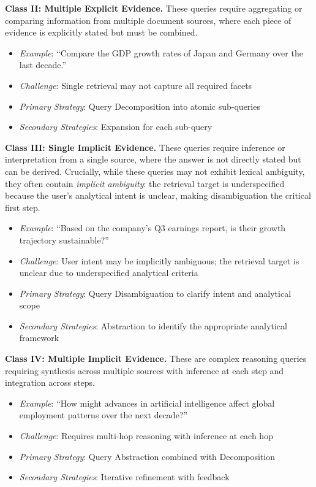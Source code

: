 \documentclass{article}
\begin{document}
\textbf{Class II: Multiple Explicit Evidence.} These queries require aggregating or comparing information from multiple document sources, where each piece of evidence is explicitly stated but must be combined.
\begin{itemize}[leftmargin=*,nosep]
    \item \textit{Example}: ``Compare the GDP growth rates of Japan and Germany over the last decade.''
    \item \textit{Challenge}: Single retrieval may not capture all required facets
    \item \textit{Primary Strategy}: Query Decomposition into atomic sub-queries
    \item \textit{Secondary Strategies}: Expansion for each sub-query
\end{itemize}

\textbf{Class III: Single Implicit Evidence.} These queries require inference or interpretation from a single source, where the answer is not directly stated but can be derived. Crucially, while these queries may not exhibit lexical ambiguity, they often contain \textit{implicit ambiguity}: the retrieval target is underspecified because the user's analytical intent is unclear, making disambiguation the critical first step.
\begin{itemize}[leftmargin=*,nosep]
    \item \textit{Example}: ``Based on the company's Q3 earnings report, is their growth trajectory sustainable?''
    \item \textit{Challenge}: User intent may be implicitly ambiguous; the retrieval target is unclear due to underspecified analytical criteria
    \item \textit{Primary Strategy}: Query Disambiguation to clarify intent and analytical scope
    \item \textit{Secondary Strategies}: Abstraction to identify the appropriate analytical framework
\end{itemize}

\textbf{Class IV: Multiple Implicit Evidence.} These are complex reasoning queries requiring synthesis across multiple sources with inference at each step and integration across steps.
\begin{itemize}[leftmargin=*,nosep]
    \item \textit{Example}: ``How might advances in artificial intelligence affect global employment patterns over the next decade?''
    \item \textit{Challenge}: Requires multi-hop reasoning with inference at each hop
    \item \textit{Primary Strategy}: Query Abstraction combined with Decomposition
    \item \textit{Secondary Strategies}: Iterative refinement with feedback
\end{itemize}
\end{document}
